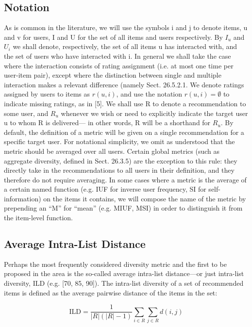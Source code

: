 \subsection{Notation}

As is common in the literature, we will use the symbols i and j to denote items, u and v for users, I and U for the set of all items and users respectively. By $I_u$ and $U_i$ we shall denote, respectively, the set of all items u has interacted with, and the set of users who have interacted with i. In general we shall take the case where the interaction consists of rating assignment (i.e. at most one time per user-item pair), except where the distinction between single and multiple interaction makes a relevant difference (namely Sect. 26.5.2.1. We denote ratings assigned by users to items as $r ( u , i )$, and use the notation $r ( u , i ) = \emptyset$ to indicate missing ratings, as in [5]. We shall use R to denote a recommendation to some user, and $R_u$ whenever we wish or need to explicitly indicate the target user u to whom R is delivered— in other words, R will be a shorthand for $R_u$. By default, the definition of a metric will be given on a single recommendation for a specific target user. For notational simplicity, we omit as understood that the metric should be averaged over all users. Certain global metrics (such as aggregate diversity, defined in Sect. 26.3.5) are the exception to this rule: they directly take in the recommendations to all users in their definition, and they therefore do not require averaging. In some cases where a metric is the average of a certain named function (e.g. IUF for inverse user frequency, SI for self-information) on the items it contains, we will compose the name of the metric by prepending an “M” for “mean” (e.g. MIUF, MSI) in order to distinguish it from the item-level function.

\subsection{Average Intra-List Distance}

Perhaps the most frequently considered diversity metric and the first to be proposed in the area is the so-called average intra-list distance—or just intra-list diversity, ILD (e.g. [70, 85, 90]). The intra-list diversity of a set of recommended items is defined as the average pairwise distance of the items in the set:

$$\mathrm { ILD } = \frac { 1 } { | R | ( | R | - 1 ) } \sum _ { i \in R } \sum _ { j \in R } d ( i , j )$$

